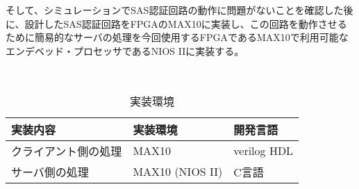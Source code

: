 \documentclass{thesis}
\begin{document}
そして、シミュレーションでSAS認証回路の動作に問題がないことを確認した後に、設計したSAS認証回路をFPGAのMAX10に実装し、この回路を動作させるために簡易的なサーバの処理を今回使用するFPGAであるMAX10で利用可能なエンデベッド・プロセッサであるNIOS IIに実装する。
\begin{table}[htb]
　\begin{center}
\caption{実装環境}
\label{実装環境}
  \begin{tabular}{|p{5cm}|p{5cm}|p{3cm}|} \hline
  実装内容                & 実装環境 & 開発言語  \\ \hline \hline
 クライアント側の処理  &  MAX10  & verilog HDL \\ \hline
 サーバ側の処理       &  MAX10 (NIOS II)  &  C言語 \\ \hline
  \end{tabular}
  \end{center}
\end{table}　\\
\end{document}
